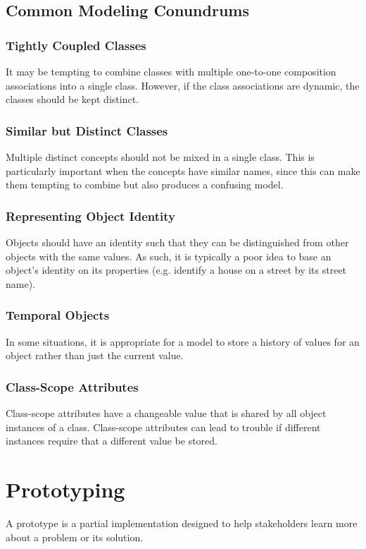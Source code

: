 \documentclass[12pt,titlepage]{article}
\let\stdsection\section
\renewcommand\section{\clearpage\stdsection}
\begin{document}
    \subsection{Common Modeling Conundrums}

      \subsubsection{Tightly Coupled Classes}
        It may be tempting to combine classes with multiple one-to-one composition associations into a single class. However, if the class associations are dynamic, the classes should
        be kept distinct.

      \subsubsection{Similar but Distinct Classes}
        Multiple distinct concepts should not be mixed in a single class. This is particularly important when the concepts have similar names, since this can make them tempting to
        combine but also produces a confusing model.

      \subsubsection{Representing Object Identity}
        Objects should have an identity such that they can be distinguished from other objects with the same values. As such, it is typically a poor idea to base an object's identity
        on its properties (e.g. identify a house on a street by its street name).

      \subsubsection{Temporal Objects}
        In some situations, it is appropriate for a model to store a history of values for an object rather than just the current value.

      \subsubsection{Class-Scope Attributes}
        Class-scope attributes have a changeable value that is shared by all object instances of a class. Class-scope attributes can lead to trouble if different instances require
        that a different value be stored.

  \section{Prototyping}
    A prototype is a partial implementation designed to help stakeholders learn more about a problem or its solution.
\end{document}
